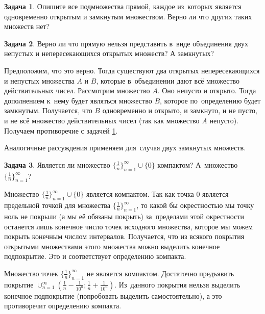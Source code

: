 \documentclass[pdftex, 12pt, a4paper]{article}
\theoremstyle{definition} %
\newtheorem{problem}{Задача}
\numberwithin{problem}{section}
\numberwithin{blits}{section}
\begin{document}
\begin{problem}\label{resh_1}
Опишите все подмножества прямой, каждое из~которых является одновременно открытым и замкнутым множеством. Верно ли что других таких множеств нет?
\begin{sol}

\end{sol}
\end{problem}

\begin{problem}
Верно ли что прямую нельзя представить в~виде объединения двух непустых и непересекающихся открытых множеств? А замкнутых?


\begin{sol}
Предположим, что это верно. Тогда существуют два открытых непересекающихся и непустых множества $A$ и $B$, которые в~объединении дают всё множество действительных чисел. Рассмотрим множество $A$. Оно непусто и открыто. Тогда дополнением к~нему будет являться множество $B$, которое по~определению будет замкнутым. Получается, что $B$ одновременно и открыто, и замкнуто, и не пусто, и не всё множество действительных чисел (так как множество $A$ непусто). Получаем противоречие с задачей \ref{resh_1}.

Аналогичные рассуждения применяем для~случая двух замкнутых множеств.
\end{sol}
\end{problem}

\begin{problem}
Является ли множество  $\{\frac{1}{n}\}_{n=1}^{\infty} \cup \{0\}$ компактом? А~множество $\{\frac{1}{n}\}_{n=1}^{\infty}$?
\begin{sol}
Множество $\{\frac{1}{n}\}_{n=1}^{\infty} \cup \{0\}$ является компактом. Так как точка $0$ является предельной точкой для множества  $\{\frac{1}{n}\}_{n=1}^{\infty}$, то какой бы окрестностью мы точку ноль не покрыли (а мы её обязаны покрыть) за~пределами этой окрестности останется лишь конечное число точек исходного множества, которое мы можем покрыть конечным числом интервалов. Получается, что из всякого покрытия открытыми множествами этого множества можно выделить конечное подпокрытие. Это и соответствует определению компакта.

Множество точек  $\{\frac{1}{n}\}_{n=1}^{\infty}$ не является компактом. Достаточно предъявить покрытие $\cup_{n=1}^{\infty} \left(\frac{1}{n} - \frac{1}{10^n}; \frac{1}{n} + \frac{1}{10^n}\right)$.
Из~данного покрытия нельзя выделить конечное подпокрытие (попробовать выделить самостоятельно), а это противоречит определению компакта.
\end{sol}
\end{problem}
\end{document}
